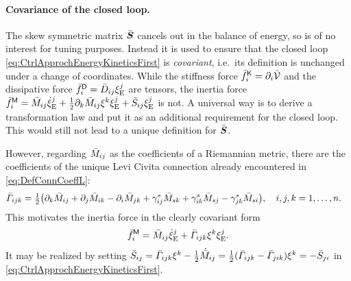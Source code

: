 \paragraph{Covariance of the closed loop.}
The skew symmetric matrix $\bar{\boldsymbol{S}}$ cancels out in the balance of energy, so is of no interest for tuning purposes.
Instead it is used to ensure that the closed loop \eqref{eq:CtrlApprochEnergyKineticsFirst} is \textit{covariant}, i.e.\ its definition is unchanged under a change of coordinates.
While the stiffness force $\bar{f}^{\mathsf{K}}_{i} = \partial_{i} \bar{\mathcal{V}}$ and the dissipative force $\bar{f}^{\mathsf{D}}_{i} = \bar{D}_{ij} \xi^{j}_{\mathrm{E}}$ are tensors, the inertia force $\bar{f}^{\mathsf{M}}_{i} = \bar{M}_{ij} \dot{\xi}^{j}_{\mathrm{E}} + \tfrac{1}{2} \partial_{k} \bar{M}_{ij} \xi^{k} \xi^{j}_{\mathrm{E}} + \bar{S}_{ij} \xi^{j}_{\mathrm{E}}$ is not.
A universal way is to derive a transformation law and put it as an additional requirement for the closed loop.
This would still not lead to a unique definition for $\bar{\boldsymbol{S}}$.

However, regarding $\bar{M}_{ij}$ as the coefficients of a Riemannian metric, there are the coefficients of the unique Levi Civita connection already encountered in \eqref{eq:DefConnCoeffL}:
\begin{align}
 \bar{\varGamma}_{ijk} &= \tfrac{1}{2}\big( \partial_k \bar{M}_{ij} + \partial_j \bar{M}_{ik} - \partial_i \bar{M}_{jk} + \gamma^{s}_{ij} \bar{M}_{sk} + \gamma^{s}_{ik} \bar{M}_{sj} - \gamma^{s}_{jk} \bar{M}_{si} \big),
\quad
 i, j, k = 1,\ldots,n
 .
\end{align}
This motivates the inertia force in the clearly covariant form
\begin{align}
 \bar{f}^{\mathsf{M}}_{i} = \bar{M}_{ij} \dot{\xi}^{j}_{\mathrm{E}} + \bar{\varGamma}_{ijk}\xi^{k} \xi^{j}_{\mathrm{E}}.
\end{align}
It may be realized by setting $\bar{S}_{ij} = \bar{\varGamma}_{ijk}\xi^{k} - \tfrac{1}{2}\dot{\bar{M}}_{ij} = \tfrac{1}{2}(\bar{\varGamma}_{ijk} - \bar{\varGamma}_{jik})\xi^{k} = -\bar{S}_{ji}$ in \eqref{eq:CtrlApprochEnergyKineticsFirst}.


